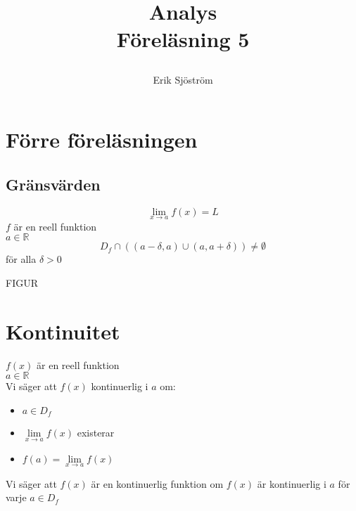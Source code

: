 

\title{
     Analys\\
     Föreläsning 5
    \author{Erik Sjöström}
}

\maketitle

\section{Förre föreläsningen} %
\label{sec:f_rre_f_rel_sningen}

\subsection{Gränsvärden} %
\label{sub:gr_nsv_rden}
\[
\lim\limits_{x \to a}f(x) = L
\]
$f$ är en reell funktion\\
$a \in \mathbb{R}$\\
\[
D_f \cap ((a - \delta, a) \cup (a, a + \delta)) \neq \emptyset
\]
för alla $\delta > 0$
\begin{center}
	FIGUR
\end{center}

\section{Kontinuitet} %
\label{sec:kontinuitet}
$f(x)$ är en reell funktion\\
$a \in \mathbb{R}$\\
Vi säger att $f(x)$ kontinuerlig i $a$ om:
\begin{itemize}
	\item $a \in D_f$
	\item $\lim\limits_{x \to a}f(x)$ existerar
	\item $f(a) = \lim\limits_{x \to a}f(x)$
\end{itemize}
Vi säger att $f(x)$ är en kontinuerlig funktion om $f(x)$ är kontinuerlig i $a$ för varje $a \in D_f$

